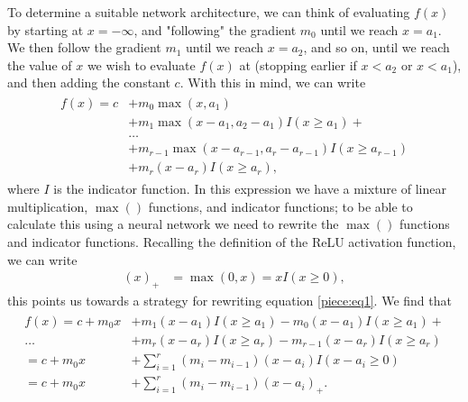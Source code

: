 \documentclass{somasmsc}
\begin{document}
To determine a suitable network architecture, we can think of evaluating $f(x)$ by starting at $x = -\infty$, and "following" the gradient $m_0$ until we reach $x = a_1$. We then follow the gradient $m_1$ until we reach $x = a_2$, and so on, until we reach the value of $x$ we wish to evaluate $f(x)$ at (stopping earlier if $x < a_2$ or $x < a_1$), and then adding the constant $c$. With this in mind, we can write
\begin{align}\label{piece:eq1}
\begin{split}
f(x) = c &+ m_0 \max\left(x, a_1\right) \\
&+ m_1 \max\left(x - a_1, a_2 - a_1\right) I(x \geq a_1) + \\
&\dots \\
&+ m_{r-1} \max\left(x - a_{r-1}, a_r - a_{r-1}\right) I(x \geq a_{r-1}) \\
&+ m_r \left(x - a_r\right) I(x \geq a_r),
\end{split}
\end{align}
where $I$ is the indicator function. In this expression we have a mixture of linear multiplication, $\max\left(\right)$ functions, and indicator functions; to be able to calculate this using a neural network we need to rewrite the $\max\left(\right)$ functions and indicator functions. Recalling the definition of the ReLU activation function, we can write
\begin{align*}
\left(x\right)_+ &= \max\left(0, x\right) = x I(x \geq 0),
\end{align*}
this points us towards a strategy for rewriting equation \ref{piece:eq1}. We find that
\begin{align}\label{piece:eq3}
\begin{split}
f(x) = c + m_0 x &+ m_1 \left(x - a_1\right) I(x \geq a_1) - m_0 \left(x - a_1\right) I(x \geq a_1) + \\
\dots &+ m_r \left(x - a_r\right) I(x \geq a_r) - m_{r-1} \left(x - a_r\right) I(x \geq a_r) \\
= c + m_0 x &+ \sum_{i=1}^r \left(m_i - m_{i-1}\right) \left(x - a_i\right) I(x - a_i \geq 0) \\
= c + m_0 x &+ \sum_{i=1}^r \left(m_i - m_{i-1}\right) \left(x - a_i\right)_+.
\end{split}
\end{align}
\end{document}
